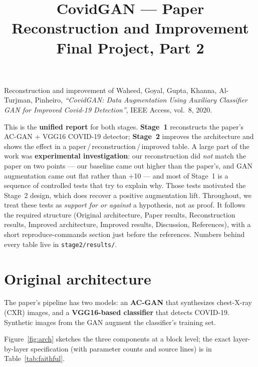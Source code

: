 \documentclass[11pt]{article}
\title{\textbf{CovidGAN --- Paper Reconstruction and Improvement}\\[4pt]
\large Final Project, Part 2}
\author{}
\date{}
\newcommand{\code}[1]{\texttt{#1}}
\begin{document}
\maketitle
\vspace{-2.5em}

\noindent
Reconstruction and improvement of Waheed, Goyal, Gupta, Khanna, Al-Turjman,
Pinheiro, \emph{``CovidGAN: Data Augmentation Using Auxiliary Classifier GAN for
Improved Covid-19 Detection''}, IEEE Access, vol.~8, 2020.

\medskip
\noindent
This is the \textbf{unified report} for both stages. \textbf{Stage~1} reconstructs
the paper's AC-GAN + VGG16 COVID-19 detector; \textbf{Stage~2} improves the
architecture and shows the effect in a paper\,/\,reconstruction\,/\,improved table.
A large part of the work was \textbf{experimental investigation}: our
reconstruction did \emph{not} match the paper on two points --- our baseline came
out higher than the paper's, and GAN augmentation came out flat rather than +10 ---
and most of Stage~1 is a sequence of controlled tests that try to explain why.
Those tests motivated the Stage~2 design, which does recover a positive
augmentation lift. Throughout, we treat these tests as \emph{support for or against}
a hypothesis, not as proof.
It follows the required structure (Original architecture, Paper results,
Reconstruction results, Improved architecture, Improved results, Discussion,
References), with a short reproduce-commands section just before the references.
Numbers behind every table live in \code{stage2/results/}.

\tableofcontents
\bigskip

\section{Original architecture}

The paper's pipeline has two models: an \textbf{AC-GAN} that synthesizes
chest-X-ray (CXR) images, and a \textbf{VGG16-based classifier} that detects
COVID-19. Synthetic images from the GAN augment the classifier's training set.

Figure~\ref{fig:arch} sketches the three components at a block level; the exact
layer-by-layer specification (with parameter counts and source lines) is in
Table~\ref{tab:faithful}.
\end{document}
